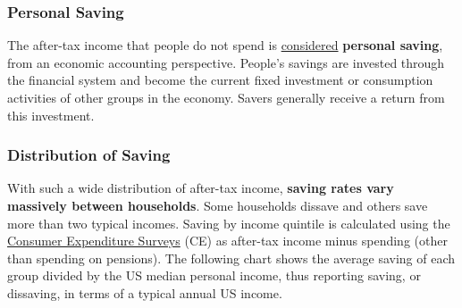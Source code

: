 \subsubsection*{Personal Saving}
\begin{minipage}{0.76\textwidth}  
\small The after-tax income that people do not spend is \href{https://www.bea.gov/index.php/help/glossary/personal-saving}{considered} \textbf{personal saving}, from an economic accounting perspective. People's savings are invested through the financial system and become the current fixed investment or consumption activities of other groups in the economy. Savers generally receive a return from this investment.


\vspace{1mm}

\vspace{3.4cm}

\hspace{5mm} \vspace{0.5mm}

\vspace{1mm}

\subsubsection*{Distribution of Saving}
\small With such a wide distribution of after-tax income, \textbf{saving rates vary massively between households}. Some households dissave and others save more than two typical incomes. Saving by income quintile is calculated using the \href{https://www.bls.gov/cex/}{Consumer Expenditure Surveys} (CE) as after-tax income minus spending (other than spending on pensions). The following chart shows the average saving of each group divided by the US median personal income, thus reporting saving, or dissaving, in terms of a typical annual US income. 
\end{minipage}
\vspace{0.5mm}

